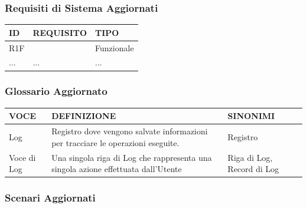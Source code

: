 \documentclass[a4paper, 11pt]{article}
\begin{document}
\subsubsection{Requisiti di Sistema Aggiornati}

\begin{center}
    \begin{tabular}{ |p{2cm}|p{8cm}|p{2cm}|  }
        \hline
        ID & REQUISITO & TIPO \\ 
        \hline
        R1F &  & Funzionale \\
        \hline
        ... & ... & ... \\
        \hline
    \end{tabular}
\end{center}

\subsubsection{Glossario Aggiornato}

\begin{center}
    \begin{tabular}{ |p{3cm}|p{6cm}|p{3cm}|  }
        \hline
        VOCE & DEFINIZIONE & SINONIMI \\
        \hline
        Log & Registro dove vengono salvate informazioni per tracciare le operazioni eseguite. & Registro \\
        \hline
        Voce di Log & Una singola riga di Log che rappresenta una singola azione effettuata dall'Utente & Riga di Log, Record di Log \\\hline
    \end{tabular}
\end{center}

\subsubsection{Scenari Aggiornati}
\end{document}
